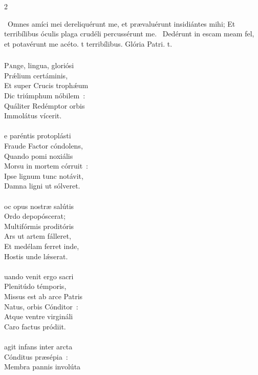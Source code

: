 \documentclass[9pt,twoside]{extarticle}
\begin{document}
\begin{multicols}{2}
\begin{tightlist}{}
\item {}~Omnes amíci mei dereliquérunt me, et prævaluérunt insidiántes mihi; \textred{*} Et terribílibus óculis plaga crudéli percussérunt me. ~Dedérunt in escam meam fel, et potavérunt me acéto. t terribílibus. Glória Patri. t.
\end{tightlist}

\subsubsection*{\center {}}
\lettrine{P}ange, lingua, gloriósi\\
Prǽlium certáminis,\\
Et super Crucis trophǽum\\
Dic triúmphum nóbilem~:\\
Quáliter Redémptor orbis\\
Immolátus vícerit.\\
\\
e paréntis protoplásti\\
Fraude Factor cóndolens,\\
Quando pomi noxiális\\
Morsu in mortem córruit~:\\
Ipse lignum tunc notávit,\\
Damna ligni ut sólveret.\\
\\
oc opus nostræ salútis\\
Ordo depopóscerat;\\
Multifórmis proditóris\\
Ars ut artem fálleret,\\
Et medélam ferret inde,\\
Hostis unde lǽserat.\\
\\
uando venit ergo sacri\\
Plenitúdo témporis,\\
Missus est ab arce Patris\\
Natus, orbis Cónditor~:\\
Atque ventre virgináli\\
Caro factus pródiit.\\
\\
agit infans inter arcta\\
Cónditus præsépia~:\\
Membra pannis involúta\\

\end{multicols}
\end{document}
